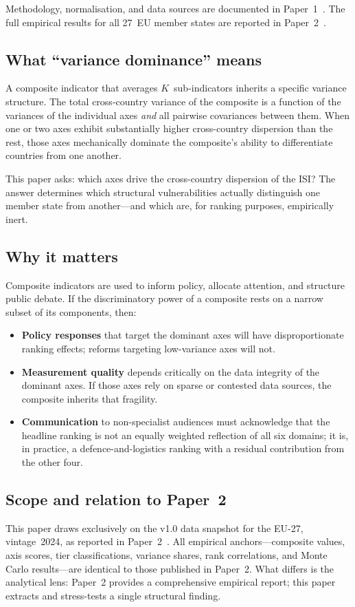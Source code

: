 Methodology, normalisation, and data sources are documented in
Paper~1~\cite{isi_paper1}.  The full empirical results for all
27~EU member states are reported in Paper~2~\cite{isi_paper2}.

\subsection{What ``variance dominance'' means}

A composite indicator that averages $K$~sub-indicators inherits a
specific variance structure.  The total cross-country variance of the
composite is a function of the variances of the individual axes
\emph{and} all pairwise covariances between them.  When one or two
axes exhibit substantially higher cross-country dispersion than the
rest, those axes mechanically dominate the composite's ability to
differentiate countries from one another.

This paper asks: which axes drive the cross-country dispersion of the
ISI?  The answer determines which structural vulnerabilities actually
distinguish one member state from another---and which are, for ranking
purposes, empirically inert.

\subsection{Why it matters}

Composite indicators are used to inform policy, allocate attention,
and structure public debate.  If the discriminatory power of a
composite rests on a narrow subset of its components, then:

\begin{itemize}[leftmargin=2em]
  \item \textbf{Policy responses} that target the dominant axes will
    have disproportionate ranking effects; reforms targeting
    low-variance axes will not.
  \item \textbf{Measurement quality} depends critically on the data
    integrity of the dominant axes.  If those axes rely on sparse or
    contested data sources, the composite inherits that fragility.
  \item \textbf{Communication} to non-specialist audiences must
    acknowledge that the headline ranking is not an equally weighted
    reflection of all six domains; it is, in practice, a
    defence-and-logistics ranking with a residual contribution from
    the other four.
\end{itemize}

\subsection{Scope and relation to Paper~2}

This paper draws exclusively on the {\ISI} v1.0 data snapshot for the
EU-27, vintage~2024, as reported in Paper~2~\cite{isi_paper2}.  All
empirical anchors---composite values, axis scores, tier
classifications, variance shares, rank correlations, and Monte Carlo
results---are identical to those published in Paper~2.  What differs
is the analytical lens: Paper~2 provides a comprehensive empirical
report; this paper extracts and stress-tests a single structural
finding.
